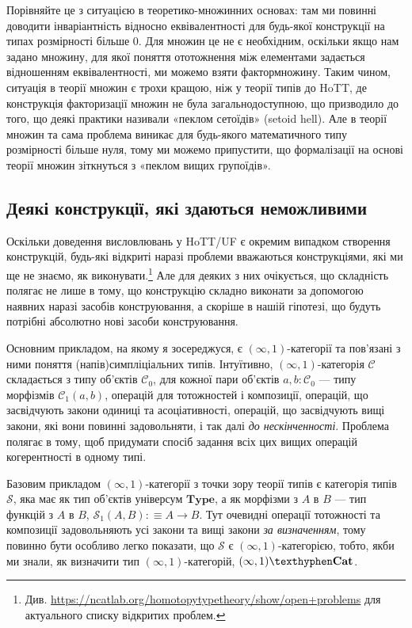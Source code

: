 \documentclass[12pt]{article}
\newcommand*{\calC}{\mathcal{C}}
\newcommand*{\calS}{\mathcal{S}}
\newcommand*{\inftyone}{\ensuremath{(\infty,1)}}
\newcommand*{\Type}{\ensuremath{\mathbf{Type}}}
\newcommand*{\inftyoneCat}{\ensuremath{(\infty,1)\mathbf{\texthyphen Cat}}}
\begin{document}
Порівняйте це з ситуацією в теоретико-множинних основах: там ми повинні доводити інваріантність відносно еквівалентності для будь-якої конструкції на типах розмірності більше $0$. Для множин це не є необхідним, оскільки якщо нам задано множину, для якої поняття ототожнення між елементами задається відношенням еквівалентності, ми можемо взяти фактормножину. Таким чином, ситуація в теорії множин є трохи кращою, ніж у теорії типів до HoTT, де конструкція факторизації множин не була загальнодоступною, що призводило до того, що деякі практики називали «пеклом сетоїдів» (setoid hell). Але в теорії множин та сама проблема виникає для будь-якого математичного типу розмірності більше нуля, тому ми можемо припустити, що формалізації на основі теорії множин зіткнуться з «пеклом вищих групоїдів».

\subsection{Деякі конструкції, які здаються неможливими}
\label{sec:negative-problems}

Оскільки доведення висловлювань у HoTT/UF є окремим випадком створення конструкцій, будь-які відкриті наразі проблеми вважаються конструкціями, які ми ще не знаємо, як виконувати.\footnote{Див. \url{https://ncatlab.org/homotopytypetheory/show/open+problems} для актуального списку відкритих проблем.} Але для деяких з них очікується, що складність полягає не лише в тому, що конструкцію складно виконати за допомогою наявних наразі засобів конструювання, а скоріше в нашій гіпотезі, що будуть потрібні абсолютно нові засоби конструювання.

Основним прикладом, на якому я зосереджуся, є \inftyone-категорії та пов'язані з ними поняття (напів)симпліціальних типів. Інтуїтивно, \inftyone-категорія $\calC$ складається з типу об'єктів $\calC_0$, для кожної пари об'єктів $a,b:\calC_0$ — типу морфізмів $\calC_1(a,b)$, операцій для тотожностей і композиції, операцій, що засвідчують закони одиниці та асоціативності, операцій, що засвідчують вищі закони, які вони повинні задовольняти, і так далі \emph{до нескінченності}. Проблема полягає в тому, щоб придумати спосіб задання всіх цих вищих операцій когерентності в одному типі.

Базовим прикладом \inftyone-категорії з точки зору теорії типів є категорія типів $\calS$, яка має як тип об'єктів універсум $\Type$, а як морфізми з $A$ в $B$ — тип функцій з $A$ в $B$, $\calS_1(A,B):\equiv A \to B$. Тут очевидні операції тотожності та композиції задовольняють усі закони та вищі закони \emph{за визначенням}, тому повинно бути особливо легко показати, що $\calS$ є \inftyone-категорією, тобто, якби ми знали, як визначити тип \inftyone-категорій, \inftyoneCat.
\end{document}
